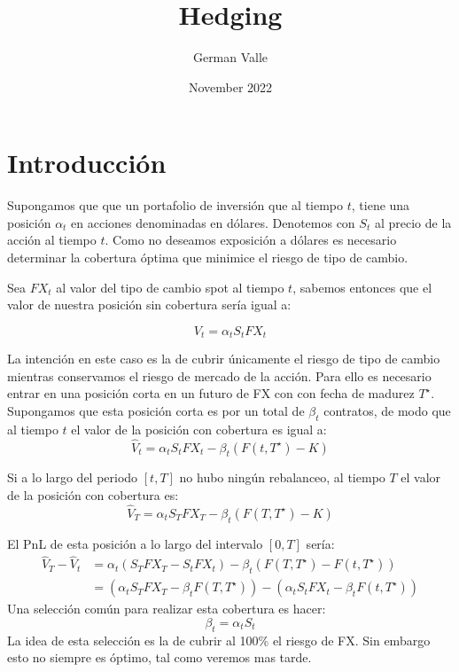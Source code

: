 \documentclass[12pt]{article}
\title{Hedging}
\author{German Valle}
\date{November 2022}
\begin{document}
\maketitle

\section{Introducción}

Supongamos que que un portafolio de inversión que al tiempo $t$, tiene una  posición  $\alpha_t$ en acciones denominadas en dólares. Denotemos con $S_t$ al precio de la acción al tiempo $t$. Como no deseamos exposición a dólares es necesario determinar la cobertura óptima que minimice el riesgo de tipo de cambio. 

Sea $FX_t$ al valor del tipo de cambio spot al tiempo $t$, sabemos entonces que el valor de nuestra posición  sin cobertura sería igual a:

\begin{equation}
    V_t = \alpha_tS_tFX_t
    \label{eq:1}
\end{equation}

La intención en este caso es la de cubrir únicamente el riesgo de tipo de cambio mientras conservamos el riesgo de mercado de la acción.  Para ello es necesario entrar en una posición corta en un futuro de FX con con fecha de madurez $T^\star$. Supongamos que esta posición corta es por un total de $\beta_t$ contratos, de modo que al tiempo $t$ el valor de la posición con cobertura es igual a:
\begin{equation}
    \hat{V}_t = \alpha_tS_tFX_t - \beta_t\left(F(t, T^\star) - K\right)
    \label{eq:2}
\end{equation}

Si a lo largo del periodo $[t, T]$ no hubo ningún rebalanceo, al tiempo $T$ el valor de la posición con cobertura es:
\begin{equation}
    \hat{V}_T = \alpha_tS_TFX_T - \beta_t\left(F(T, T^\star) - K\right)
    \label{eq:3}    
\end{equation}

El PnL de esta posición a lo largo del intervalo $[0,T]$ sería:
\begin{equation}
    \begin{split}
        \hat{V}_T - \hat{V}_t  & = \alpha_t\left(S_TFX_T - S_tFX_t\right) - \beta_t\left(F(T, T^\star) - F(t, T^\star)\right)\\
        & = \left(\alpha_tS_TFX_T - \beta_tF(T, T^\star)\right) - \left(\alpha_tS_tFX_t  - \beta_tF(t, T^\star)\right)
    \end{split}
        \label{eq:4}
\end{equation}
Una selección común para realizar esta cobertura es hacer:
\begin{equation}
    \beta_t = \alpha_tS_t
    \label{eq:5}
\end{equation}
La idea de esta selección es la de cubrir al 100\% el riesgo de FX. Sin embargo esto no siempre es óptimo, tal como veremos mas tarde.
\end{document}
